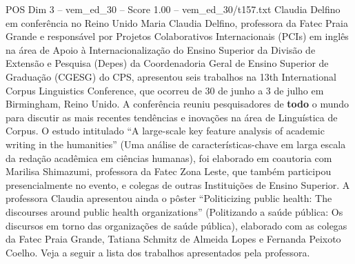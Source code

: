 \begin{textsample}{POS Dim 3 – vem\_ed\_30 – Score 1.00 – vem\_ed\_30/t157.txt}  \label{ex:f3_pos_053}
Claudia Delfino em conferência no Reino Unido Maria Claudia Delfino, professora da Fatec Praia Grande e responsável por Projetos Colaborativos Internacionais (PCIs) em inglês na área de Apoio à Internacionalização do Ensino Superior da Divisão de Extensão e Pesquisa (Depes) da Coordenadoria Geral de Ensino Superior de Graduação (CGESG) do CPS, apresentou seis trabalhos na 13th International Corpus Linguistics Conference, que ocorreu de 30 de junho a 3 de julho em Birmingham, Reino Unido.
A conferência reuniu pesquisadores de \textbf{todo} o mundo para discutir as mais recentes tendências e inovações na área de Linguística de Corpus.
O estudo intitulado “A large-scale key feature analysis of academic writing in the humanities” (Uma análise de características-chave em larga escala da redação acadêmica em ciências humanas), foi elaborado em coautoria com Marilisa Shimazumi, professora da Fatec Zona Leste, que também participou presencialmente no evento, e colegas de outras Instituições de Ensino Superior.
A professora Claudia apresentou ainda o pôster “Politicizing public health: The discourses around public health organizations” (Politizando a saúde pública: Os discursos em torno das organizações de saúde pública), elaborado com as colegas da Fatec Praia Grande, Tatiana Schmitz de Almeida Lopes e Fernanda Peixoto Coelho.
Veja a seguir a lista dos trabalhos apresentados pela professora.

\end{textsample}
